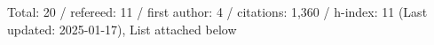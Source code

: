 Total: 20 / refereed: 11 / first author: 4 / citations: 1,360 / h-index: 11 (Last updated: 2025-01-17), List attached below